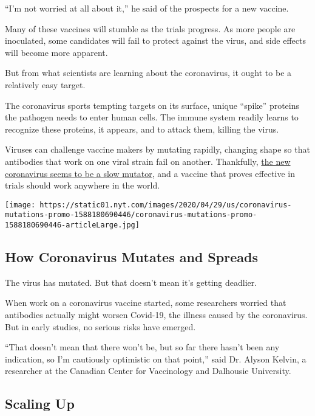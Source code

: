 ``I'm not worried at all about it,'' he said of the prospects for a new
vaccine.

Many of these vaccines will stumble as the trials progress. As more
people are inoculated, some candidates will fail to protect against the
virus, and side effects will become more apparent.

But from what scientists are learning about the coronavirus, it ought to
be a relatively easy target.

The coronavirus sports tempting targets on its surface, unique ``spike''
proteins the pathogen needs to enter human cells. The immune system
readily learns to recognize these proteins, it appears, and to attack
them, killing the virus.

Viruses can challenge vaccine makers by mutating rapidly, changing shape
so that antibodies that work on one viral strain fail on another.
Thankfully,
\href{https://www.nytimes.com/2020/05/06/health/coronavirus-mutation-transmission.html}{the
new coronavirus seems to be a slow mutator}, and a vaccine that proves
effective in trials should work anywhere in the world.

\href{https://www.nytimes.com/interactive/2020/04/30/science/coronavirus-mutations.html}{}

\texttt{[image: https://static01.nyt.com/images/2020/04/29/us/coronavirus-mutations-promo-1588180690446/coronavirus-mutations-promo-1588180690446-articleLarge.jpg]}

\hypertarget{how-coronavirus-mutates-and-spreads}{%
\subsection{How Coronavirus Mutates and
Spreads}\label{how-coronavirus-mutates-and-spreads}}

The virus has mutated. But that doesn't mean it's getting deadlier.

When work on a coronavirus vaccine started, some researchers worried
that antibodies actually might worsen Covid-19, the illness caused by
the coronavirus. But in early studies, no serious risks have emerged.

``That doesn't mean that there won't be, but so far there hasn't been
any indication, so I'm cautiously optimistic on that point,'' said Dr.
Alyson Kelvin, a researcher at the Canadian Center for Vaccinology and
Dalhousie University.

\hypertarget{scaling-up}{%
\subsection{Scaling Up}\label{scaling-up}}


